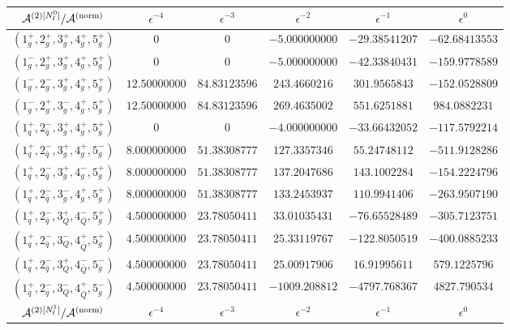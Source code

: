 \begin{table}[!htbp]
  \centering
  \begin{adjustbox}{width=1\textwidth}
    \begin{tabular}{cccccc}
      \toprule
      $\mathcal{A}^{(2)[N_\mathrm{f}^0]}/\mathcal{A}^\mathrm{(norm)}$	  &   $\epsilon^{-4}$   &   $\epsilon^{-3}$   &   $\epsilon^{-2}$   &   $\epsilon^{-1}$   &   $\epsilon^{0}$   \\
      \midrule
      $( 1_g^+, 2_g^+, 3_g^+, 4_g^+, 5_g^+ )$ & 0 & 0 & $-5.000000000$ & $-29.38541207$ & $-62.68413553$ \\
      $( 1_g^-, 2_g^+, 3_g^+, 4_g^+, 5_g^+ )$ & 0 & 0 & $-5.000000000$ & $-42.33840431$ & $-159.9778589$ \\
      $( 1_g^-, 2_g^-, 3_g^+, 4_g^+, 5_g^+ )$ & $12.50000000$ & $84.83123596$ & $243.4660216$ & $301.9565843$ & $-152.0528809$ \\
      $( 1_g^-, 2_g^+, 3_g^-, 4_g^+, 5_g^+ )$ & $12.50000000$ & $84.83123596$ & $269.4635002$ & $551.6251881$ & $984.0882231$ \\
      \midrule
      $( 1_q^+, 2_{\bar q}^-, 3_g^+, 4_g^+, 5_g^+ )$ & 0 & 0 & $-4.000000000$ & $-33.66432052$ & $-117.5792214$ \\
      $( 1_q^+, 2_{\bar q}^-, 3_g^+, 4_g^+, 5_g^- )$ & $8.000000000$ & $51.38308777$ & $127.3357346$ & $55.24748112$ & $-511.9128286$ \\
      $( 1_q^+, 2_{\bar q}^-, 3_g^+, 4_g^-, 5_g^+ )$ & $8.000000000$ & $51.38308777$ & $137.2047686$ & $143.1002284$ & $-154.2224796$ \\
      $( 1_q^+, 2_{\bar q}^-, 3_g^-, 4_g^+, 5_g^+ )$ & $8.000000000$ & $51.38308777$ & $133.2453937$ & $110.9941406$ & $-263.9507190$ \\
      \midrule
      $( 1_q^+, 2_{\bar q}^-, 3_Q^+, 4_{\bar Q}^-, 5_g^+ )$ & $4.500000000$ & $23.78050411$ & $33.01035431$ & $-76.65528489$ & $-305.7123751$ \\
      $( 1_q^+, 2_{\bar q}^-, 3_Q^-, 4_{\bar Q}^+, 5_g^+ )$ & $4.500000000$ & $23.78050411$ & $25.33119767$ & $-122.8050519$ & $-400.0885233$ \\
      $( 1_q^+, 2_{\bar q}^-, 3_Q^+, 4_{\bar Q}^-, 5_g^- )$ & $4.500000000$ & $23.78050411$ & $25.00917906$ & $16.91995611$ & $579.1225796$ \\
      $( 1_q^+, 2_{\bar q}^-, 3_Q^-, 4_{\bar Q}^+, 5_g^- )$ & $4.500000000$ & $23.78050411$ & $-1009.208812$ & $-4797.768367$ & $4827.790534$ \\
      \midrule
      $\mathcal{A}^{(2)[N_\mathrm{f}^1]}/\mathcal{A}^\mathrm{(norm)}$	  &   $\epsilon^{-4}$   &   $\epsilon^{-3}$   &   $\epsilon^{-2}$   &   $\epsilon^{-1}$   &   $\epsilon^{0}$   \\

\end{tabular}
\end{adjustbox}
\end{table}
